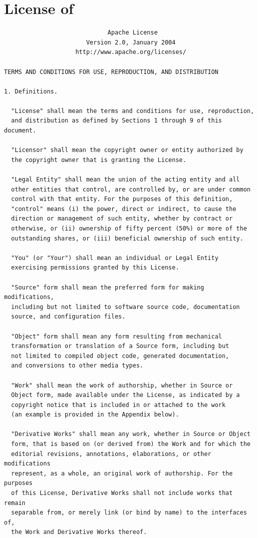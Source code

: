 \clearpage
\section*{License of \fl}
\begin{verbatim}
                             Apache License
                       Version 2.0, January 2004
                    http://www.apache.org/licenses/

TERMS AND CONDITIONS FOR USE, REPRODUCTION, AND DISTRIBUTION

1. Definitions.

  "License" shall mean the terms and conditions for use, reproduction,
  and distribution as defined by Sections 1 through 9 of this document.

  "Licensor" shall mean the copyright owner or entity authorized by
  the copyright owner that is granting the License.

  "Legal Entity" shall mean the union of the acting entity and all
  other entities that control, are controlled by, or are under common
  control with that entity. For the purposes of this definition,
  "control" means (i) the power, direct or indirect, to cause the
  direction or management of such entity, whether by contract or
  otherwise, or (ii) ownership of fifty percent (50%) or more of the
  outstanding shares, or (iii) beneficial ownership of such entity.

  "You" (or "Your") shall mean an individual or Legal Entity
  exercising permissions granted by this License.

  "Source" form shall mean the preferred form for making modifications,
  including but not limited to software source code, documentation
  source, and configuration files.

  "Object" form shall mean any form resulting from mechanical
  transformation or translation of a Source form, including but
  not limited to compiled object code, generated documentation,
  and conversions to other media types.

  "Work" shall mean the work of authorship, whether in Source or
  Object form, made available under the License, as indicated by a
  copyright notice that is included in or attached to the work
  (an example is provided in the Appendix below).

  "Derivative Works" shall mean any work, whether in Source or Object
  form, that is based on (or derived from) the Work and for which the
  editorial revisions, annotations, elaborations, or other modifications
  represent, as a whole, an original work of authorship. For the purposes
  of this License, Derivative Works shall not include works that remain
  separable from, or merely link (or bind by name) to the interfaces of,
  the Work and Derivative Works thereof.


\end{verbatim}

